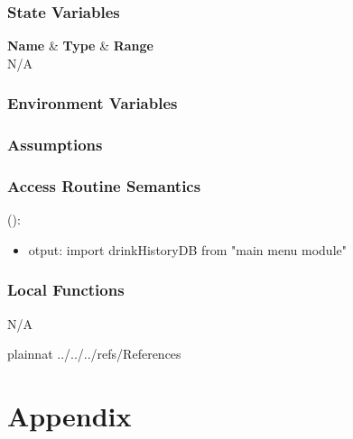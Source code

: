 \documentclass[12pt, titlepage]{article}
\begin{document}
\subsubsection{State Variables}

\textbf{Name}  & \textbf{Type}  & \textbf{Range}\\
N/A

\subsubsection{Environment Variables}


\subsubsection{Assumptions}


\subsubsection{Access Routine Semantics}

\noindent {}():
\begin{itemize}
\item otput:  import drinkHistoryDB from "main menu module"
\end{itemize}


\subsubsection{Local Functions}

N/A

\newpage


 {plainnat}
 {../../../refs/References}

\newpage

\section{Appendix} \label{Appendix}
\end{document}
